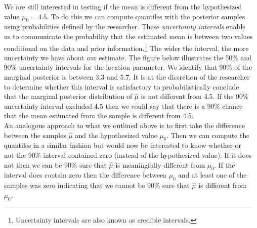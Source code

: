\documentclass[12pt]{article}
\begin{document}
\begin{figure}[H]
\begin{minipage}{1\linewidth}
\footnotesize
\end{minipage}
\end{figure}

\noindent We are still interested in testing if the mean is different from the hypothesized value $\mu_0 = 4.5$. To do this we can compute quantiles with the posterior samples using probabilities defined by the researcher. These \emph{uncertainty intervals} enable us to communicate the probability that the estimated mean is between two values conditional on the data and prior information.\footnote{Uncertainty intervals are also known as credible intervals.}  The wider the interval, the more uncertainty we have about our estimate. The figure below illustrates the 50\% and 90\% uncertainty intervals for the location parameter. We identify that 90\% of the marginal posterior is between 3.3 and 5.7. It is at the discretion of the researcher to determine whether this interval is satisfactory to probabilistically conclude that the marginal posterior distribution of $\hat{\mu}$ is not different from 4.5. If the 90\% uncertainty interval excluded 4.5 then we could say that there is a 90\% chance that the mean estimated from the sample is different from 4.5. \\

\noindent An analogous approach to what we outlined above is to first take the difference between the samples $\hat{\mu}$ and the hypothesized value $\mu_0$. Then we can compute the quantiles in a similar fashion but would now be interested to know whether or not the 90\% interval contained zero (instead of the hypothesized value). If it does not then we can be 90\% sure that $\hat{\mu}$ is meaningfully different from $\mu_0$. If the interval does contain zero then the difference between $\mu_0$ and at least one of the samples was zero indicating that we cannot be 90\% sure that $\hat{\mu}$ is different from $\mu_0$. \\
\end{document}
